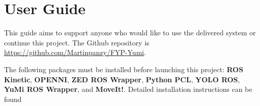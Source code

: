 \chapter{User Guide}
This guide aims to support anyone who would like to use the delivered system or continue this project. The Github repository is \url{https://github.com/Martinpanzy/FYP-Yumi}.

The following packages must be installed before launching this project: \textbf{ROS Kinetic}, \textbf{OPENNI}, \textbf{ZED ROS Wrapper}, \textbf{Python PCL}, \textbf{YOLO ROS}, \textbf{YuMi ROS Wrapper}, and \textbf{MoveIt!}. Detailed installation instructions can be found 







